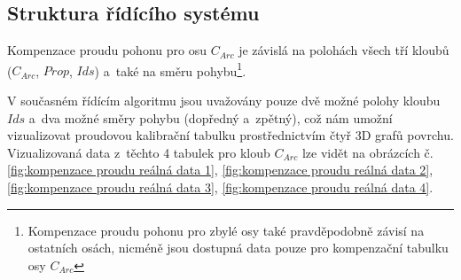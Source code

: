 \subsection{Struktura řídícího systému}
Kompenzace proudu pohonu pro osu $C_{Arc}$ je závislá na polohách všech tří kloubů
($C_{Arc}$, $Prop$, $Ids$) a~také na směru pohybu\footnote{Kompenzace proudu pohonu pro zbylé osy také pravděpodobně závisí na ostatních osách, nicméně jsou dostupná data pouze pro kompenzační tabulku osy $C_{Arc}$}.

V současném řídícím algoritmu jsou uvažovány pouze dvě možné polohy kloubu $Ids$ a~dva možné směry pohybu (dopředný a~zpětný), což nám umožní vizualizovat proudovou kalibrační tabulku prostřednictvím čtyř 3D grafů povrchu. Vizualizovaná data z~těchto 4 tabulek pro kloub $C_{Arc}$ lze vidět na obrázcích č. \ref{fig:kompenzace proudu reálná data 1}, \ref{fig:kompenzace proudu reálná data 2},
\ref{fig:kompenzace proudu reálná data 3}, \ref{fig:kompenzace proudu reálná data 4}.

